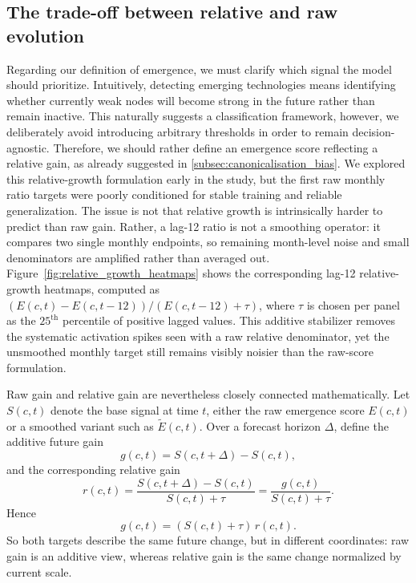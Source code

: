 \documentclass[pdflatex,sn-basic]{sn-jnl}
\begin{document}
\subsection{The trade-off between relative and raw evolution}
Regarding our definition of emergence, we must clarify which signal the model should prioritize. Intuitively, detecting emerging technologies means identifying whether currently weak nodes will become strong in the future rather than remain inactive. This naturally suggests a classification framework, however, we deliberately avoid introducing arbitrary thresholds in order to remain decision-agnostic. Therefore, we should rather define an emergence score reflecting a relative gain, as already suggested in \ref{subsec:canonicalisation_bias}. We explored this relative-growth formulation early in the study, but the first raw monthly ratio targets were poorly conditioned for stable training and reliable generalization. The issue is not that relative growth is intrinsically harder to predict than raw gain. Rather, a lag-12 ratio is not a smoothing operator: it compares two single monthly endpoints, so remaining month-level noise and small denominators are amplified rather than averaged out. Figure~\ref{fig:relative_growth_heatmaps} shows the corresponding lag-12 relative-growth heatmaps, computed as \((E(c,t)-E(c,t-12))/(E(c,t-12)+\tau)\), where \(\tau\) is chosen per panel as the \(25^{\text{th}}\) percentile of positive lagged values. This additive stabilizer removes the systematic activation spikes seen with a raw relative denominator, yet the unsmoothed monthly target still remains visibly noisier than the raw-score formulation.

Raw gain and relative gain are nevertheless closely connected mathematically. Let \(S(c,t)\) denote the base signal at time \(t\), either the raw emergence score \(E(c,t)\) or a smoothed variant such as \(\tilde{E}(c,t)\). Over a forecast horizon \(\Delta\), define the additive future gain
\[
g(c,t)=S(c,t+\Delta)-S(c,t),
\]
and the corresponding relative gain
\[
r(c,t)=\frac{S(c,t+\Delta)-S(c,t)}{S(c,t)+\tau}
=\frac{g(c,t)}{S(c,t)+\tau}.
\]
Hence
\[
g(c,t)=(S(c,t)+\tau)\,r(c,t).
\]
So both targets describe the same future change, but in different coordinates: raw gain is an additive view, whereas relative gain is the same change normalized by current scale.
\end{document}
